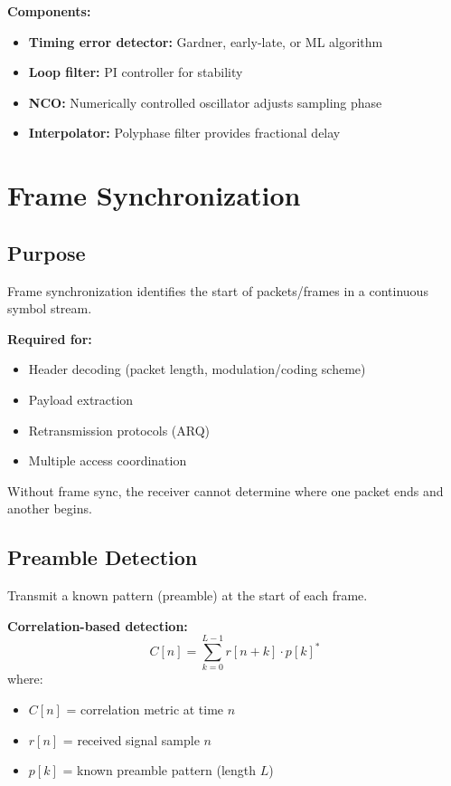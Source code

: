\textbf{Components:}
\begin{itemize}
\item \textbf{Timing error detector:} Gardner, early-late, or ML algorithm
\item \textbf{Loop filter:} PI controller for stability
\item \textbf{NCO:} Numerically controlled oscillator adjusts sampling phase
\item \textbf{Interpolator:} Polyphase filter provides fractional delay
\end{itemize}

\section{Frame Synchronization}

\subsection{Purpose}

Frame synchronization identifies the start of packets/frames in a continuous symbol stream.

\textbf{Required for:}
\begin{itemize}
\item Header decoding (packet length, modulation/coding scheme)
\item Payload extraction
\item Retransmission protocols (ARQ)
\item Multiple access coordination
\end{itemize}

Without frame sync, the receiver cannot determine where one packet ends and another begins.

\subsection{Preamble Detection}

Transmit a known pattern (preamble) at the start of each frame.

\textbf{Correlation-based detection:}
\begin{equation}
C[n] = \sum_{k=0}^{L-1} r[n+k] \cdot p[k]^*
\end{equation}
where:
\begin{itemize}
\item $C[n]$ = correlation metric at time $n$
\item $r[n]$ = received signal sample $n$
\item $p[k]$ = known preamble pattern (length $L$)
\end{itemize}


